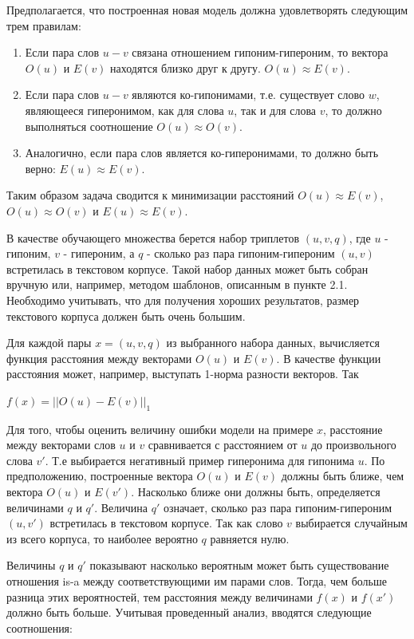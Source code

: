 Предполагается, что построенная новая модель должна удовлетворять следующим
трем правилам:

\begin{enumerate}
\item Если пара слов $u-v$ связана отношением гипоним-гипероним, то вектора $O(u)$ и $E(v)$ находятся близко друг к другу. $O(u) \approx E(v)$.

\item Если пара слов $u-v$ являются ко-гипонимами, т.е. существует слово $w$,
являющееся гиперонимом, как для слова $u$, так и для слова $v$, то должно
выполняться соотношение $O(u) \approx O(v)$.

\item Аналогично, если пара слов является ко-гиперонимами, то должно быть верно: $E(u) \approx E(v)$.
\end{enumerate}

Таким образом задача сводится к минимизации расстояний $O(u) \approx E(v)$, $O(u) \approx O(v)$ и $E(u) \approx E(v)$.

В качестве обучающего множества берется набор триплетов $(u, v, q)$, где $u$ - гипоним, $v$ - гипероним, а $q$ - сколько раз пара гипоним-гипероним $(u, v)$ встретилась в текстовом корпусе. Такой набор данных может быть собран вручную или,
например, методом шаблонов, описанным в пункте 2.1. Необходимо учитывать, что
для получения хороших результатов, размер текстового корпуса должен быть
очень большим.

Для каждой пары $x = (u, v, q)$ из выбранного набора данных, вычисляется функция
расстояния между векторами $O(u)$ и $E(v)$. В качестве функции расстояния может,
например, выступать 1-норма разности векторов. Так

$f(x) = ||O(u) - E(v)||_1$

Для того, чтобы оценить величину ошибки модели на примере $x$, расстояние между
векторами слов $u$ и $v$ сравнивается с расстоянием от $u$ до произвольного слова $v'$.
Т.е выбирается негативный пример гиперонима для гипонима $u$. По
предположению, построенные вектора $O(u)$ и $E(v)$ должны быть ближе, чем
вектора $O(u)$ и $E(v')$. Насколько ближе они должны быть, определяется величинами $q$ и $q'$. Величина $q'$ означает, сколько раз пара гипоним-гипероним $(u, v')$
встретилась в текстовом корпусе. Так как слово $v$ выбирается случайным из всего
корпуса, то наиболее вероятно $q$ равняется нулю.

Величины $q$ и $q'$ показывают насколько вероятным может быть существование
отношения is-a между соответствующими им парами слов. Тогда, чем больше
разница этих вероятностей, тем расстояния между величинами $f(x)$ и $f(x')$ должно
быть больше. Учитывая проведенный анализ, вводятся следующие соотношения:

